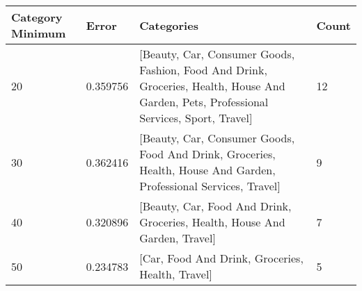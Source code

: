 \begin{tabular}{p{2cm}|p{1.8cm}|p{7.5cm}|p{1.4cm}}
\toprule
 Category Minimum &    Error &                                                                                                                              Categories &  Count \\
\midrule
               20 & 0.359756 & [Beauty, Car, Consumer Goods, Fashion, Food And Drink, Groceries, Health, House And Garden, Pets, Professional Services, Sport, Travel] &     12 \\
               30 & 0.362416 &                       [Beauty, Car, Consumer Goods, Food And Drink, Groceries, Health, House And Garden, Professional Services, Travel] &      9 \\
               40 & 0.320896 &                                                              [Beauty, Car, Food And Drink, Groceries, Health, House And Garden, Travel] &      7 \\
               50 & 0.234783 &                                                                                        [Car, Food And Drink, Groceries, Health, Travel] &      5 \\
\bottomrule
\end{tabular}
